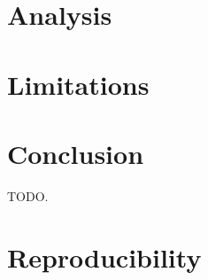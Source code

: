 \documentclass{article}
\begin{document}
\section{Analysis}

\section{Limitations}

\section{Conclusion}

\begin{ack}
TODO.
\end{ack}

\nocite{*}



\appendix

\section{Reproducibility}
\end{document}
